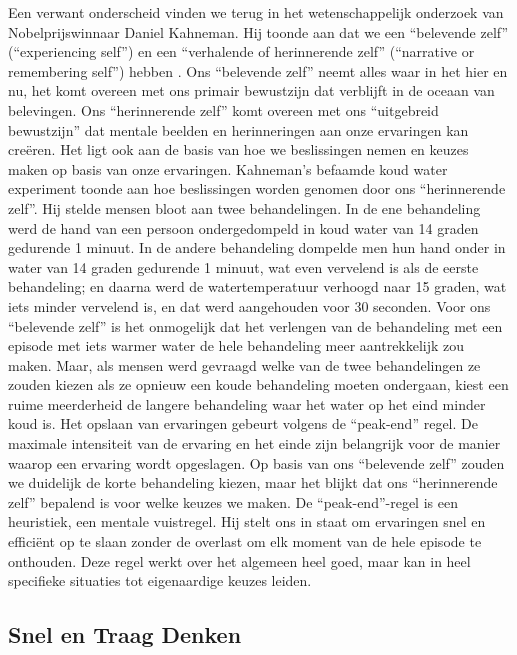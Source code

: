 \documentclass[
  11pt,
]{book}
\begin{document}
Een verwant onderscheid vinden we terug in het wetenschappelijk onderzoek van Nobelprijswinnaar Daniel Kahneman. Hij toonde aan dat we een ``belevende zelf'' (``experiencing self'') en een ``verhalende of herinnerende zelf'' (``narrative or remembering self'') hebben \citep{Kahneman2012}. Ons ``belevende zelf'' neemt alles waar in het hier en nu, het komt overeen met ons primair bewustzijn dat verblijft in de oceaan van belevingen. Ons ``herinnerende zelf'' komt overeen met ons ``uitgebreid bewustzijn'' dat mentale beelden en herinneringen aan onze ervaringen kan creëren. Het ligt ook aan de basis van hoe we beslissingen nemen en keuzes maken op basis van onze ervaringen. Kahneman's befaamde koud water experiment toonde aan hoe beslissingen worden genomen door ons ``herinnerende zelf''. Hij stelde mensen bloot aan twee behandelingen. In de ene behandeling werd de hand van een persoon ondergedompeld in koud water van 14 graden gedurende 1 minuut. In de andere behandeling dompelde men hun hand onder in water van 14 graden gedurende 1 minuut, wat even vervelend is als de eerste behandeling; en daarna werd de watertemperatuur verhoogd naar 15 graden, wat iets minder vervelend is, en dat werd aangehouden voor 30 seconden. Voor ons ``belevende zelf'' is het onmogelijk dat het verlengen van de behandeling met een episode met iets warmer water de hele behandeling meer aantrekkelijk zou maken. Maar, als mensen werd gevraagd welke van de twee behandelingen ze zouden kiezen als ze opnieuw een koude behandeling moeten ondergaan, kiest een ruime meerderheid de langere behandeling waar het water op het eind minder koud is. Het opslaan van ervaringen gebeurt volgens de ``peak-end'' regel. De maximale intensiteit van de ervaring en het einde zijn belangrijk voor de manier waarop een ervaring wordt opgeslagen. Op basis van ons ``belevende zelf'' zouden we duidelijk de korte behandeling kiezen, maar het blijkt dat ons ``herinnerende zelf'' bepalend is voor welke keuzes we maken. De ``peak-end''-regel is een heuristiek, een mentale vuistregel. Hij stelt ons in staat om ervaringen snel en efficiënt op te slaan zonder de overlast om elk moment van de hele episode te onthouden. Deze regel werkt over het algemeen heel goed, maar kan in heel specifieke situaties tot eigenaardige keuzes leiden.

\subsection{Snel en Traag Denken}\label{snel-en-traag-denken}
\end{document}
